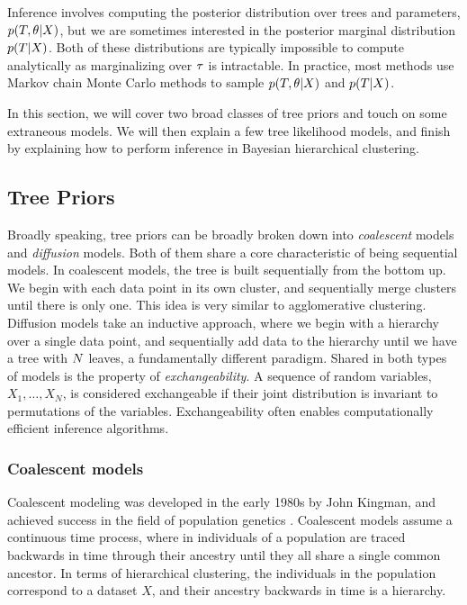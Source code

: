 Inference involves computing the posterior
distribution over trees and parameters, 
$p(T, \theta | X)$, but we are sometimes interested
in the
posterior marginal distribution $p(T | X)$.
Both of these distributions are typically
impossible to compute
analytically as marginalizing over $\tau$
is intractable.
In practice, most methods use Markov chain Monte Carlo
methods to sample $p(T, \theta | X)$
and $p(T|X)$.

In this section, we will cover two broad
classes of tree priors and touch on
some extraneous models. We will then explain
a few tree likelihood models, and 
finish by explaining how to perform
inference in Bayesian hierarchical clustering.

\subsection{Tree Priors}

Broadly speaking, 
tree priors can be broadly broken down into 
\emph{coalescent} models
and 
\emph{diffusion} models.
Both of them share a core characteristic
of being sequential models.
In coalescent models, the tree is built sequentially
from the bottom up. We begin with each
data point in its own cluster,
and sequentially merge clusters until
there is only one. This idea is
very similar to agglomerative clustering.
Diffusion models take an inductive approach,
where we begin with a hierarchy over a single
data point, and sequentially add data to the hierarchy until
we have a tree with $N$ leaves,
a fundamentally different paradigm.
Shared in both types of models is the property
of
\emph{exchangeability}.
A sequence of random variables, $X_1, \ldots, X_N$,
is considered exchangeable
if their joint distribution
is invariant to permutations of the variables.
Exchangeability often enables computationally efficient
inference algorithms.

\subsubsection*{Coalescent models}

Coalescent modeling was developed
in the early 1980s by John Kingman,
and achieved success in the field
of population genetics
\citep{Kingman1982}.
Coalescent models assume a
continuous time process,
where in individuals of a population
are traced backwards in time
through their ancestry until
they all share a single common ancestor.
In terms of hierarchical clustering,
the individuals in the population
correspond to a dataset $X$,
and their
ancestry backwards in time
is a hierarchy.

